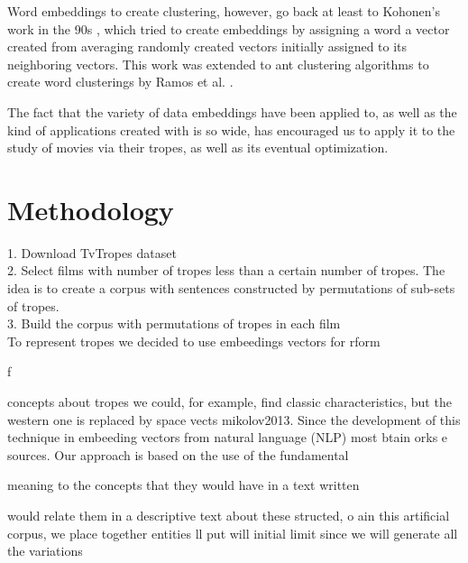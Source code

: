 \documentclass[letterpaper]{article}
\begin{document}
        Word embeddings to create clustering, however, go back at
        least to Kohonen's work in the 90s
        \cite{kohonen1997exploration}, which tried to create
        embeddings by assigning a word a vector created from averaging
        randomly created vectors initially assigned to its neighboring
        vectors. This work was extended to ant clustering algorithms
        to create word clusterings by Ramos et
        al. \cite{DBLP:journals/corr/abs-cs-0412075}.

        The fact that the variety of data embeddings have been applied
        to, as well as the kind of applications created with is so
        wide, has encouraged us to apply it to the study of movies via
        their tropes, as well as its eventual optimization.

 \section{Methodology}
\label{sec:met}
	
	1. Download TvTropes dataset \\
	2. Select films with number of tropes less than a certain number of tropes. The idea is to create a corpus with sentences constructed by permutations of sub-sets of tropes. \\
	3. Build the corpus with permutations of tropes in each film \\


	To represent tropes we decided to use embeedings vectors for
rform

f

        concepts about tropes we could, for example, find classic
characteristics, but the western one is replaced by space
vects
{mikolov2013}. Since the development of this technique in
        embeeding vectors from natural language (NLP) most
btain
orks
e
 sources. Our approach is based on the use of the fundamental

       meaning to the concepts that they would have in a text written

       would relate them in a descriptive text about these
structed,
o
ain this artificial corpus, we place together entities
ll
put
will
       initial limit since we will generate all the variations
\end{document}
